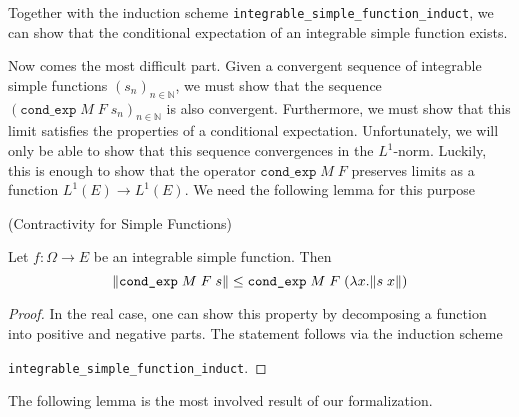 Together with the induction scheme \texttt{integrable\_simple\_function\_induct}, we can show that the conditional expectation of an integrable simple function exists.

Now comes the most difficult part. Given a convergent sequence of integrable simple functions $(s_n)_{n \in \mathbb{N}}$, we must show that the sequence $(\texttt{cond\_exp} \; M \; F \; s_n)_{n \in \mathbb{N}}$ is also convergent. Furthermore, we must show that this limit satisfies the properties of a conditional expectation. Unfortunately, we will only be able to show that this sequence convergences in the $L^1$-norm. Luckily, this is enough to show that the operator $\texttt{cond\_exp} \; M \; F$ preserves limits as a function $L^1(E) \rightarrow L^1(E)$. We need the following lemma for this purpose

\begin{lemma} (Contractivity for Simple Functions) \par
	Let $f : \Omega \rightarrow E$ be an integrable simple function. Then
	\[
		\normalfont\lVert \texttt{cond\_exp} \; M \; F \; s \rVert \le \texttt{cond\_exp} \; M \; F \; (\lambda x. \lVert s \; x \rVert)
	\]
\end{lemma}
\begin{proof}
	In the real case, one can show this property by decomposing a function into positive and negative parts. The statement follows via the induction scheme \par\noindent\texttt{integrable\_simple\_function\_induct}.
\end{proof}

The following lemma is the most involved result of our formalization.

